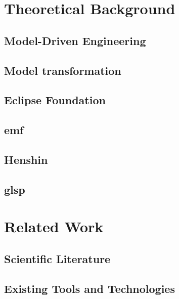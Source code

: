 \documentclass[conference, onecolumn]{IEEEtran}
\begin{document}
  

  \section{Theoretical Background}
  \label{sec:background}

  \subsection{Model-Driven Engineering}
  \label{subsec:model-driven-engineering}

  \subsection{Model transformation}
  \label{subsec:model-checking}

  \subsection{Eclipse Foundation}
  \label{subsec:eclipse-foundation}

  \subsection{\acf{emf}}
  \label{subsec:emf}

  \subsection{Henshin}
  \label{subsec:henshin}

  \subsection{\ac{glsp}}
  \label{subsec:glsp}

  \section{Related Work}
  \label{sec:related-work}

  \subsection{Scientific Literature}
  \label{subsec:related-scientific-literature}

  \subsection{Existing Tools and Technologies}
  \label{subsec:related-tools}
\end{document}
